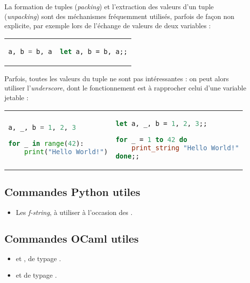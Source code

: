 \documentclass{hibiscus}
\begin{document}
\par La formation de tuples (\textit{packing}) et l'extraction des valeurs d'un tuple (\textit{unpacking}) sont des méchanismes fréquemment utilisés, parfois de façon non explicite, par exemple lors de l'échange de valeurs de deux variables :

\begin{tabular}{p{} p{}}
\begin{lstlisting}[language=Python]
a, b = b, a
\end{lstlisting}
&
\begin{lstlisting}[language=Caml]
let a, b = b, a;;
\end{lstlisting}
\end{tabular}

\par Parfois, toutes les valeurs du tuple ne sont pas intéressantes : on peut alors utiliser l'\textit{underscore}, dont le fonctionnement est à rapprocher celui d'une variable jetable :

\begin{tabular}{p{} p{}}
\begin{lstlisting}[language=Python]
a, _, b = 1, 2, 3

for _ in range(42):
    print("Hello World!")
\end{lstlisting}
&
\begin{lstlisting}[language=Caml]
let a, _, b = 1, 2, 3;;

for _ = 1 to 42 do
    print_string "Hello World!"
done;;
\end{lstlisting}
\end{tabular}

\subsection{Commandes Python utiles}

\begin{itemize}
\item Les \textit{f-string}, à utiliser à l'occasion des .
\end{itemize}

\subsection{Commandes OCaml utiles}

\begin{itemize}
\item {} et  , de typage .
\item {} et  de typage .
\end{itemize}
\end{document}
